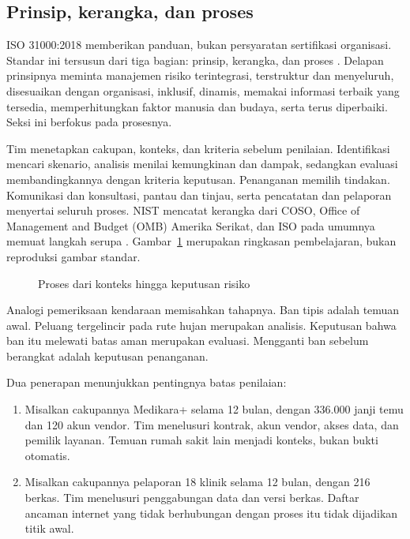 \subsection*{Prinsip, kerangka, dan proses}

ISO 31000:2018 memberikan panduan, bukan persyaratan sertifikasi organisasi. Standar ini tersusun
dari tiga bagian: prinsip, kerangka, dan proses \cite{iso31000-2018,c05-ncsu-iso}. Delapan prinsipnya
meminta manajemen risiko terintegrasi, terstruktur dan menyeluruh, disesuaikan dengan organisasi,
inklusif, dinamis, memakai informasi terbaik yang tersedia, memperhitungkan faktor manusia dan
budaya, serta terus diperbaiki. Seksi ini berfokus pada prosesnya.

Tim menetapkan cakupan, konteks, dan kriteria sebelum penilaian. Identifikasi mencari skenario,
analisis menilai kemungkinan dan dampak, sedangkan evaluasi membandingkannya dengan kriteria
keputusan. Penanganan memilih tindakan. Komunikasi dan konsultasi, pantau dan tinjau, serta
pencatatan dan pelaporan menyertai seluruh proses. NIST mencatat kerangka dari COSO, Office of
Management and Budget (OMB) Amerika Serikat, dan ISO pada umumnya memuat langkah serupa
\cite{c05-nist-ir8286r1}. Gambar~\ref{fig:ch05-proses} merupakan ringkasan pembelajaran, bukan
reproduksi gambar standar.

\begin{figure}[!htb]
  \centering
  
  \caption{Proses dari konteks hingga keputusan risiko}
  \label{fig:ch05-proses}
\end{figure}

Analogi pemeriksaan kendaraan memisahkan tahapnya. Ban tipis adalah temuan awal. Peluang tergelincir
pada rute hujan merupakan analisis. Keputusan bahwa ban itu melewati batas aman merupakan evaluasi.
Mengganti ban sebelum berangkat adalah keputusan penanganan.

Dua penerapan menunjukkan pentingnya batas penilaian:
\begin{enumerate}
  \item Misalkan cakupannya Medikara+ selama 12 bulan, dengan 336.000 janji temu dan 120 akun vendor.
  Tim menelusuri kontrak, akun vendor, akses data, dan pemilik layanan. Temuan rumah sakit lain
  menjadi konteks, bukan bukti otomatis.
  \item Misalkan cakupannya pelaporan 18 klinik selama 12 bulan, dengan 216 berkas. Tim menelusuri
  penggabungan data dan versi berkas. Daftar ancaman internet yang tidak berhubungan dengan proses
  itu tidak dijadikan titik awal.
\end{enumerate}

